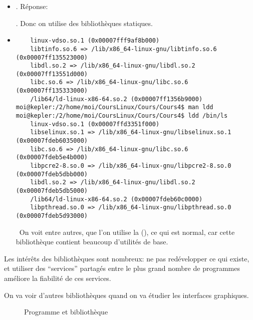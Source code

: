 \begin{itemize}
\item {}. Réponse:

  . Donc on utilise des
  bibliothèques statiques.

\item {}
  
\begin{verbatim}
  	linux-vdso.so.1 (0x00007fff9af8b000)
	libtinfo.so.6 => /lib/x86_64-linux-gnu/libtinfo.so.6 (0x00007ff135523000)
	libdl.so.2 => /lib/x86_64-linux-gnu/libdl.so.2 (0x00007ff13551d000)
	libc.so.6 => /lib/x86_64-linux-gnu/libc.so.6 (0x00007ff135333000)
	/lib64/ld-linux-x86-64.so.2 (0x00007ff1356b9000)
moi@kepler:/2/home/moi/CoursLinux/Cours/Cours4$ man ldd
moi@kepler:/2/home/moi/CoursLinux/Cours/Cours4$ ldd /bin/ls
	linux-vdso.so.1 (0x00007ffd3351f000)
	libselinux.so.1 => /lib/x86_64-linux-gnu/libselinux.so.1 (0x00007fdeb6035000)
	libc.so.6 => /lib/x86_64-linux-gnu/libc.so.6 (0x00007fdeb5e4b000)
	libpcre2-8.so.0 => /lib/x86_64-linux-gnu/libpcre2-8.so.0 (0x00007fdeb5dbb000)
	libdl.so.2 => /lib/x86_64-linux-gnu/libdl.so.2 (0x00007fdeb5db5000)
	/lib64/ld-linux-x86-64.so.2 (0x00007fdeb60c0000)
	libpthread.so.0 => /lib/x86_64-linux-gnu/libpthread.so.0 (0x00007fdeb5d93000)

\end{verbatim}
\
On voit entre autres, que l'on utilise la 
(), ce qui est normal, car cette bibliothèque contient
beaucoup d'utilités de base.
\end{itemize}

Les intérêts des bibliothèques sont nombreux: ne pas redévelopper ce
qui existe, et utiliser des ``services'' partagés entre le plus grand
nombre de programmes améliore la fiabilité de ces services.

On va voir d'autres bibliothèques quand on va étudier les interfaces graphiques.
\begin{figure}
  
  \caption{Programme et bibliothèque}
  \label{bib}
\end{figure}\medskip

